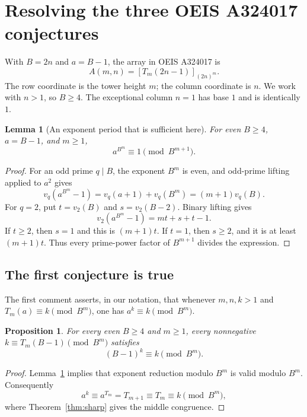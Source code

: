 \documentclass[11pt,letterpaper]{article}
\numberwithin{equation}{section}
\newtheorem{lemma}[theorem]{Lemma}
\newtheorem{proposition}[theorem]{Proposition}
\theoremstyle{definition}
\theoremstyle{remark}
\newcommand{\res}[2]{\left[#1\right]_{#2}}
\begin{document}
\section{Resolving the three OEIS A324017 conjectures}\label{sec:OEIS}

With $B=2n$ and $a=B-1$, the array in OEIS A324017 \cite{OEIS324017} is
\begin{equation}\label{eq:array}
 A(m,n)=\res{T_m(2n-1)}{(2n)^m}.
\end{equation}
The row coordinate is the tower height $m$; the column coordinate is $n$. We work with $n>1$, so $B\ge4$. The exceptional column $n=1$ has base $1$ and is identically $1$.

\begin{lemma}[An exponent period that is sufficient here]\label{lem:period}
For even $B\ge4$, $a=B-1$, and $m\ge1$,
\begin{equation}\label{eq:period}
 a^{B^m}\equiv1\pmod{B^{m+1}}.
\end{equation}
\end{lemma}
\begin{proof}
For an odd prime $q\mid B$, the exponent $B^m$ is even, and odd-prime lifting applied to $a^2$ gives
\[
 v_q(a^{B^m}-1)=v_q(a+1)+v_q(B^m)=(m+1)v_q(B).
\]
For $q=2$, put $t=v_2(B)$ and $s=v_2(B-2)$. Binary lifting gives
\[
 v_2(a^{B^m}-1)=mt+s+t-1.
\]
If $t\ge2$, then $s=1$ and this is $(m+1)t$. If $t=1$, then $s\ge2$, and it is at least $(m+1)t$. Thus every prime-power factor of $B^{m+1}$ divides the expression.
\end{proof}

\subsection{The first conjecture is true}

The first comment asserts, in our notation, that whenever $m,n,k>1$ and $T_m(a)\equiv k\pmod{B^m}$, one has $a^k\equiv k\pmod{B^m}$.

\begin{proposition}\label{prop:oeis1}
For every even $B\ge4$ and $m\ge1$, every nonnegative $k\equiv T_m(B-1)\pmod{B^m}$ satisfies
\[
 (B-1)^k\equiv k\pmod{B^m}.
\]
\end{proposition}
\begin{proof}
Lemma~\ref{lem:period} implies that exponent reduction modulo $B^m$ is valid modulo $B^m$. Consequently
\[
 a^k\equiv a^{T_m}=T_{m+1}\equiv T_m\equiv k\pmod{B^m},
\]
where Theorem~\ref{thm:sharp} gives the middle congruence.
\end{proof}
\end{document}
